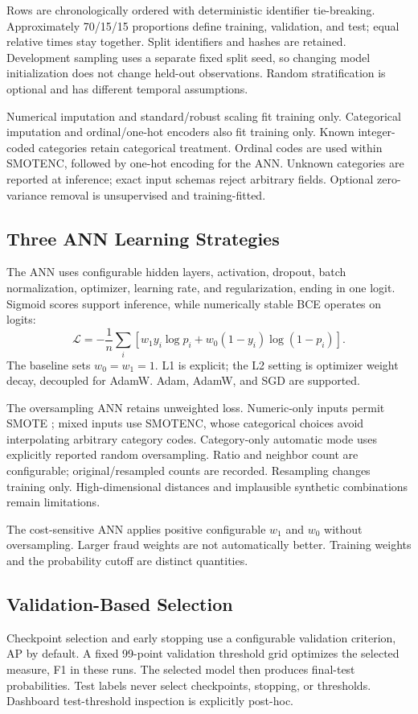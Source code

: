 \documentclass[11pt,a4paper]{article}
\begin{document}
Rows are chronologically ordered with deterministic identifier tie-breaking. Approximately 70/15/15 proportions define training, validation, and test; equal relative times stay together. Split identifiers and hashes are retained. Development sampling uses a separate fixed split seed, so changing model initialization does not change held-out observations. Random stratification is optional and has different temporal assumptions.

Numerical imputation and standard/robust scaling fit training only. Categorical imputation and ordinal/one-hot encoders also fit training only. Known integer-coded categories retain categorical treatment. Ordinal codes are used within SMOTENC, followed by one-hot encoding for the ANN. Unknown categories are reported at inference; exact input schemas reject arbitrary fields. Optional zero-variance removal is unsupervised and training-fitted.

\subsection{Three ANN Learning Strategies}
The ANN uses configurable hidden layers, activation, dropout, batch normalization, optimizer, learning rate, and regularization, ending in one logit. Sigmoid scores support inference, while numerically stable BCE operates on logits:
\begin{equation}
\mathcal L=-\frac1n\sum_i\left[w_1y_i\log p_i+w_0(1-y_i)\log(1-p_i)\right].
\end{equation}
The baseline sets $w_0=w_1=1$. L1 is explicit; the L2 setting is optimizer weight decay, decoupled for AdamW. Adam, AdamW, and SGD are supported.

The oversampling ANN retains unweighted loss. Numeric-only inputs permit SMOTE \cite{chawla2002smote}; mixed inputs use SMOTENC, whose categorical choices avoid interpolating arbitrary category codes. Category-only automatic mode uses explicitly reported random oversampling. Ratio and neighbor count are configurable; original/resampled counts are recorded. Resampling changes training only. High-dimensional distances and implausible synthetic combinations remain limitations.

The cost-sensitive ANN applies positive configurable $w_1$ and $w_0$ without oversampling. Larger fraud weights are not automatically better. Training weights and the probability cutoff are distinct quantities.

\subsection{Validation-Based Selection}
Checkpoint selection and early stopping use a configurable validation criterion, AP by default. A fixed 99-point validation threshold grid optimizes the selected measure, F1 in these runs. The selected model then produces final-test probabilities. Test labels never select checkpoints, stopping, or thresholds. Dashboard test-threshold inspection is explicitly post-hoc.
\end{document}
